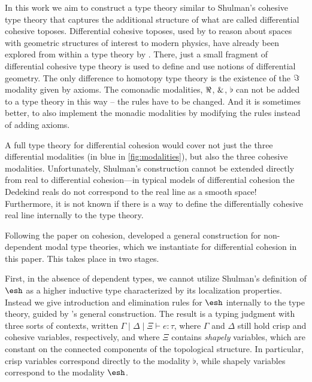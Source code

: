 \documentclass{article}
\begin{document}
In this work we aim to construct a type theory similar to Shulman's cohesive
type theory that captures the additional structure of what are called
differential cohesive toposes.  Differential cohesive toposes, used by \citet{Schreiber2013}
to reason about spaces with geometric structures of interest to modern physics,
have already been explored from within a type theory by \citet{Wellen2017}.
There, just a small fragment of differential cohesive type theory is used to
define and use notions of differential geometry. 
The only difference to homotopy type theory
 is the existence of the $\Im$ modality given by axioms.
The comonadic modalities, $\Re$, $\&$, $\flat$ can not be added to a type theory in this way -- 
the rules have to be changed.
And it is sometimes better, to also implement the monadic modalities by modifying the rules instead of adding axioms.

A full type theory for differential cohesion would cover not just the three
differential modalities (in blue in \cref{fig:modalities}), but also the three
cohesive modalities. Unfortunately, Shulman's construction cannot be extended
directly from real to differential cohesion---in typical models of differential
cohesion the Dedekind reals do not correspond to the real line as a smooth
space! Furthermore, it is not known if there is a way to define the
differentially cohesive real line internally to the type theory.

Following the \citeyear{Licata2016} paper on cohesion, \citet{Licata2017}
developed a general construction for non-dependent modal type theories, which we
instantiate for differential cohesion in this paper. This takes place in two
stages.

First, in the absence of dependent types, we cannot utilize Shulman's definition
of $\shape$ as a higher inductive type characterized by its localization
properties. Instead we give introduction and elimination rules for $\shape$
internally to the type theory, guided by \citeauthor{Licata2017}'s general
construction. The result is a typing judgment with three sorts of contexts,
written $\Gamma \mid \Delta \mid \Xi \vdash e : \tau$, where $\Gamma$ and
$\Delta$ still hold crisp and cohesive variables, respectively, and where $\Xi$
contains \emph{shapely} variables, which are constant on the connected
components of the topological structure. In particular, crisp variables
correspond directly to the modality $\flat$, while shapely variables correspond
to the modality $\shape$.
\end{document}
